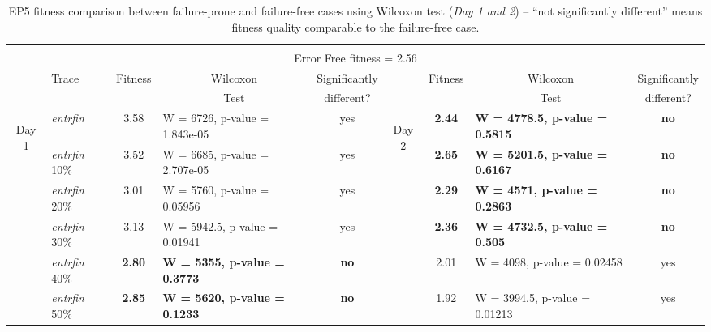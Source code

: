 \documentclass[graybox]{sty/svmult}
\begin{document}
\begin{table*}
    \caption{EP5 fitness comparison between failure-prone and failure-free cases using Wilcoxon test (\emph{Day 1 and 2}) -- ``not significantly
    different'' means fitness quality comparable to the failure-free case.}
    \begin{tiny}
\begin{center}
    \begin{tabular}{|l| l c l c |c| c l c|}
        \multicolumn{9}{c}{} \\[1ex]
        \multicolumn{9}{c}{Error Free fitness = 2.56 } \\
        \hline \hline
        \multicolumn{1}{c}{}& \multirow{2}{*}{Trace} &\multirow{2}{*}{Fitness} & \multicolumn{1}{c}{Wilcoxon} &
        \multicolumn{1}{c}{Significantly} & \multicolumn{1}{c}{}&\multirow{2}{*}{Fitness} &\multicolumn{1}{c}{Wilcoxon}
        &\multicolumn{1}{c}{Significantly} \\
        \multicolumn{1}{c}{}& & & \multicolumn{1}{c}{Test} &\multicolumn{1}{c}{different?} & \multicolumn{1}{c}{}& &
        \multicolumn{1}{c}{Test} & \multicolumn{1}{c}{different?}\\

        \hline
        \multicolumn{1}{|c|}{\multirow{21}{*}{\begin{sideways}Day 1\end{sideways}}} &
            \emph{entrfin} &  3.58   & W = 6726, p-value = 1.843e-05 & yes  &
            \multicolumn{1}{|c|}{\multirow{21}{*}{\begin{sideways}Day 2\end{sideways}}} &  \textbf{2.44}       & \textbf{W = 4778.5, p-value = 0.5815 }   & \textbf{no} \\
& \emph{entrfin} 10\%                &  3.52   & W = 6685, p-value = 2.707e-05          & yes &  &  \textbf{2.65}       & \textbf{W = 5201.5, p-value = 0.6167 }   & \textbf{no} \\
& \emph{entrfin} 20\%                &  3.01   & W = 5760, p-value = 0.05956            & yes &  &  \textbf{2.29}       & \textbf{W = 4571, p-value = 0.2863   }   & \textbf{no} \\
& \emph{entrfin} 30\%                &  3.13   & W = 5942.5, p-value = 0.01941          & yes &  &  \textbf{2.36}       & \textbf{W = 4732.5, p-value = 0.505  }   & \textbf{no} \\
& \emph{entrfin} 40\%                &  \textbf{2.80}   & \textbf{W = 5355, p-value = 0.3773} & \textbf{no} & &  2.01  & W = 4098, p-value = 0.02458              & yes \\
& \emph{entrfin} 50\%                &  \textbf{2.85}   & \textbf{W = 5620, p-value = 0.1233} & \textbf{no} & &  1.92  & W = 3994.5, p-value = 0.01213            & yes \\ [1ex]
 

\end{tabular}
\end{center}
\end{tiny}
\end{table*}
\end{document}

